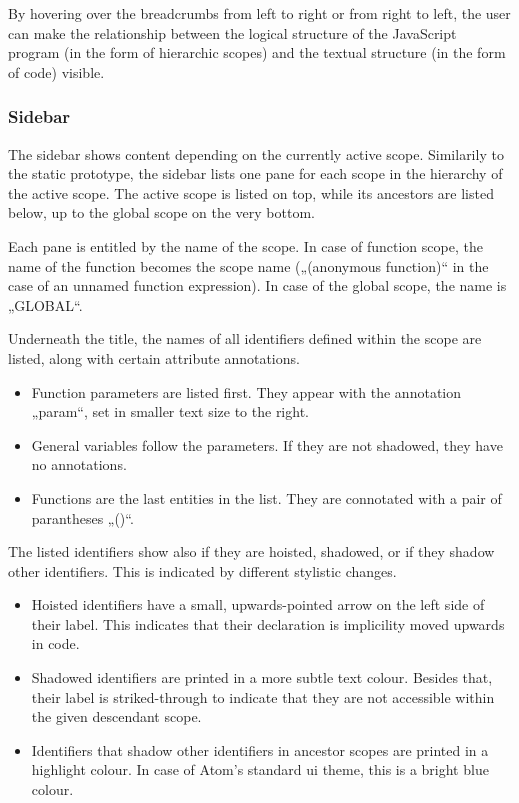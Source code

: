 By hovering over the breadcrumbs from left to right or from right to
left, the user can make the relationship between the logical structure
of the JavaScript program (in the form of hierarchic scopes) and the
textual structure (in the form of code) visible.

\subsubsection{Sidebar}\label{sidebar}

The sidebar shows content depending on the currently active scope.
Similarily to the static prototype, the sidebar lists one pane for each
scope in the hierarchy of the active scope. The active scope is listed
on top, while its ancestors are listed below, up to the global scope on
the very bottom.

Each pane is entitled by the name of the scope. In case of function
scope, the name of the function becomes the scope name („(anonymous
function)“ in the case of an unnamed function expression). In case of
the global scope, the name is „GLOBAL“.

Underneath the title, the names of all identifiers defined within the
scope are listed, along with certain attribute annotations.

\begin{itemize}
\itemsep1pt\parskip0pt
\item
  Function parameters are listed first. They appear with the annotation
  „param“, set in smaller text size to the right.
\item
  General variables follow the parameters. If they are not shadowed,
  they have no annotations.
\item
  Functions are the last entities in the list. They are connotated with
  a pair of parantheses „()“.
\end{itemize}

The listed identifiers show also if they are hoisted, shadowed, or if
they shadow other identifiers. This is indicated by different stylistic
changes.

\begin{itemize}
\itemsep1pt\parskip0pt
\item
  Hoisted identifiers have a small, upwards-pointed arrow on the left
  side of their label. This indicates that their declaration is
  implicility moved upwards in code.
\item
  Shadowed identifiers are printed in a more subtle text colour. Besides
  that, their label is striked-through to indicate that they are not
  accessible within the given descendant scope.
\item
  Identifiers that shadow other identifiers in ancestor scopes are
  printed in a highlight colour. In case of Atom’s standard \ac{ui}
  theme, this is a bright blue colour.
\end{itemize}

